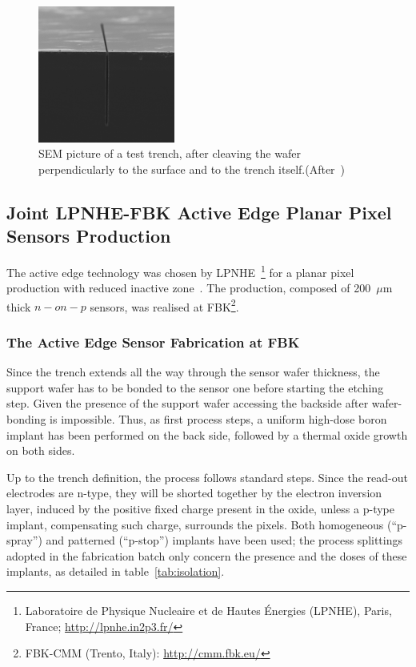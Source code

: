 \begin{figure}[!htpb]
\begin{center}
\includegraphics[width=0.40\textwidth]{trench.pdf}
\caption{\label{fig:trench}SEM picture of  a test trench, after cleaving the wafer perpendicularly to the surface and to the trench itself.(After~\cite{bib:nim2012})}
\end{center}
\end{figure}


\subsection{Joint LPNHE-FBK  Active Edge Planar Pixel Sensors Production}
The active edge technology was chosen  by LPNHE~\footnote{Laboratoire de Physique Nucleaire et de Hautes \'Energies (LPNHE), Paris, France; \url{http://lpnhe.in2p3.fr/}} for a  planar pixel production
 with reduced inactive zone~\cite{bib:nim2012}.
The production, composed of 200~$\mu$m thick $n-on-p$ sensors, was realised at FBK\footnote{FBK-CMM (Trento, Italy): \url{http://cmm.fbk.eu/}}.

\subsubsection{The Active Edge Sensor Fabrication at FBK}
Since the trench extends all the way through the sensor wafer thickness, the support wafer has to 
be bonded to the sensor one before starting the etching step.
Given the presence of the  support wafer  accessing the backside  after wafer-bonding is impossible.
Thus, as first process steps, a uniform high-dose boron implant has been performed on the back side, 
followed by a thermal oxide growth on
both sides.

Up to the trench definition, the process follows standard steps. Since the read-out electrodes are n-type, they will be shorted together by the electron
inversion layer, induced by the positive fixed charge present in the oxide, unless a p-type implant, compensating such charge, surrounds the pixels.
Both homogeneous (``p-spray'') and patterned (``p-stop'') implants have been used;
the process splittings adopted in the fabrication batch only concern the presence and the doses of these implants,  as detailed in table~\ref{tab:isolation}.



